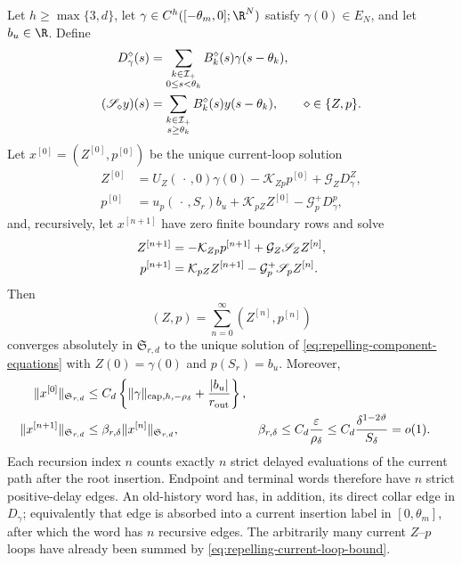 \begin{lemma}
Let \(h\ge\max\{3,d\}\), let
\(\gamma\in C^h([-\theta_m,0];\R^N)\) satisfy
\(\gamma(0)\in E_N\), and let \(b_u\in\R\).  Define
\begin{align}
 D_\gamma^\diamond(s)
 &=\sum_{\substack{k\in\mathcal I_+\\0\le s<\theta_k}}
       B_k^\diamond(s)\gamma(s-\theta_k),\notag\\
 (\mathscr S_\diamond y)(s)
 &=\sum_{\substack{k\in\mathcal I_+\\s\ge\theta_k}}
       B_k^\diamond(s)y(s-\theta_k),
 \qquad \diamond\in\{Z,p\}.                     \label{eq:repelling-old-and-strict-sources}
\end{align}
Let \(x^{[0]}=(Z^{[0]},p^{[0]})\) be the unique current-loop solution
\begin{align*}
 Z^{[0]}&=U_Z(\,\cdot\,,0)\gamma(0)
     -\mathcal K_{Zp}p^{[0]}+\mathcal G_ZD_\gamma^Z,\\
 p^{[0]}&=u_p(\,\cdot\,,S_r)b_u
     +\mathcal K_{pZ}Z^{[0]}-\mathcal G_p^+D_\gamma^p,
\end{align*}
and, recursively, let \(x^{[n+1]}\) have zero finite boundary rows and solve
\begin{align}
 Z^{[n+1]}&=-\mathcal K_{Zp}p^{[n+1]}
                  +\mathcal G_Z\mathscr S_ZZ^{[n]},\notag\\
 p^{[n+1]}&=\mathcal K_{pZ}Z^{[n+1]}
                  -\mathcal G_p^+\mathscr S_pZ^{[n]}.
                                                               \label{eq:repelling-component-generation-recursion}
\end{align}
Then
\begin{equation}
 (Z,p)=\sum_{n=0}^\infty(Z^{[n]},p^{[n]})           \label{eq:repelling-component-generation-series}
\end{equation}
converges absolutely in \(\mathfrak S_{r,d}\) to the unique solution of
\cref{eq:repelling-component-equations} with
\(Z(0)=\gamma(0)\) and \(p(S_r)=b_u\).  Moreover,
\begin{align}
 \|x^{[0]}\|_{\mathfrak S_{r,d}}
 &\le C_d\left\{\|\gamma\|_{\mathrm{cap},h,-\rho_\delta}
                         +\frac{|b_u|}{r_{\rm out}}\right\},\notag\\
 \|x^{[n+1]}\|_{\mathfrak S_{r,d}}
 &\le\beta_{r,\delta}\|x^{[n]}\|_{\mathfrak S_{r,d}},
 &\beta_{r,\delta}
 &\le C_d\frac{\varepsilon}{\rho_\delta}
  \le C_d\frac{\delta^{1-2\vartheta}}{S_\delta}=o(1).       \label{eq:repelling-generation-number}
\end{align}
Each recursion index \(n\) counts exactly \(n\) strict delayed evaluations
of the current path after the root insertion.  Endpoint and terminal words
therefore have \(n\) strict positive-delay edges.  An old-history word has,
in addition, its direct collar edge in \(D_\gamma\); equivalently that edge
is absorbed into a current insertion label in \([0,\theta_m]\), after which
the word has \(n\) recursive edges.  The arbitrarily many current
\(Z\)--\(p\) loops have already been summed by
\cref{eq:repelling-current-loop-bound}.
\end{lemma}

